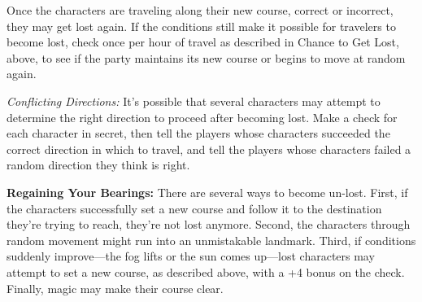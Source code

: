 Once the characters are traveling along their new course, correct or incorrect, they may get lost again. If the conditions still make it possible for travelers to become lost, check once per hour of travel as described in Chance to Get Lost, above, to see if the party maintains its new course or begins to move at random again.

\textit{Conflicting Directions:} It's possible that several characters may attempt to determine the right direction to proceed after becoming lost. Make a  check for each character in secret, then tell the players whose characters succeeded the correct direction in which to travel, and tell the players whose characters failed a random direction they think is right.

\textbf{Regaining Your Bearings:} There are several ways to become un-lost. First, if the characters successfully set a new course and follow it to the destination they're trying to reach, they're not lost anymore. Second, the characters through random movement might run into an unmistakable landmark. Third, if conditions suddenly improve---the fog lifts or the sun comes up---lost characters may attempt to set a new course, as described above, with a +4 bonus on the  check. Finally, magic may make their course clear.
